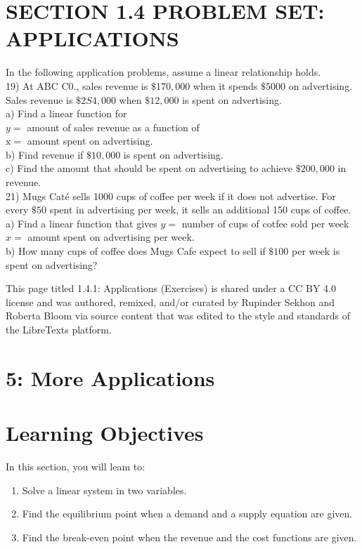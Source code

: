 \section*{SECTION 1.4 PROBLEM SET: APPLICATIONS}
In the following application problems, assume a linear relationship holds.\\
19) At ABC C0., sales revenue is $\$ 170,000$ when it spends $\$ 5000$ on advertising.\\
Sales revenue is $\$ 2 S 4,000$ when $\$ 12,000$ is spent on advertising.\\
a) Find a linear function for\\
$y=$ amount of sales revenue as a function of\\
$\mathrm{x}=$ amount spent on advertising.\\
b) Find revenue if $\$ 10,000$ is spent on advertising.\\
c) Find the amount that should be spent on advertising to achieve $\$ 200,000$ in revenue.\\
21) Mugs Caté sells 1000 cups of coffee per week if it does not advertise. For every $\$ 50$ spent in advertising per week, it sells an additional 150 cups of coffee.\\
a) Find a linear function that gives $y=$ number of cups of cotfee sold per week\\
$x=$ amount spent on advertising per week.\\
b) How many cups of coffee does Mugs Cafe expect to sell if $\$ 100$ per week is spent on advertising?

This page titled 1.4.1: Applications (Exercises) is shared under a CC BY 4.0 license and was authored, remixed, and/or curated by Rupinder Sekhon and Roberta Bloom via source content that was edited to the style and standards of the LibreTexts platform.

\section*{5: More Applications}
\section*{Learning Objectives}
In this section, you will leam to:

\begin{enumerate}
  \item Solve a linear system in two variables.
  \item Find the equilibrium point when a demand and a supply equation are given.
  \item Find the break-even point when the revenue and the cost functions are given.
\end{enumerate}

